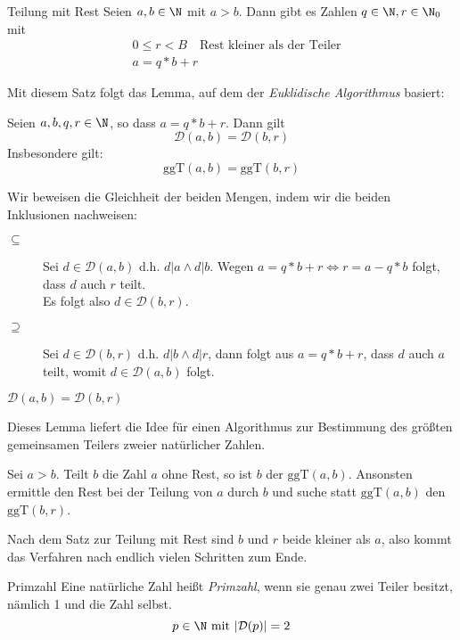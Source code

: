 \begin{satz}{Teilung mit Rest}
  Seien $a,b\in\N$ mit $a>b$. Dann gibt es Zahlen $q\in\N, r\in\N_0$ mit
  \begin{align*}
    &0\leq r<B \quad\text{Rest kleiner als der Teiler}\\
    &a=q*b+r
  \end{align*}
\end{satz}
Mit diesem Satz folgt das Lemma, auf dem der \emph{Euklidische Algorithmus} basiert:
\begin{lemma}{}
  Seien $a,b,q,r\in\N$, so dass $a=q*b+r$. Dann gilt
  \begin{equation*}
    \mathcal{D}(a,b)=\mathcal{D}(b,r)
  \end{equation*}
  Insbesondere gilt:
  \begin{equation*}
    \mathrm{ggT}(a,b)=\mathrm{ggT}(b,r)
  \end{equation*}
\end{lemma}
\beweis
Wir beweisen die Gleichheit der beiden Mengen, indem wir die beiden Inklusionen nachweisen:

\begin{description}
  \item[\glqq$\subseteq$\grqq]
  Sei $d\in\mathcal{D}(a,b)$ d.h. $d|a \wedge d|b$. Wegen $a=q*b+r \Leftrightarrow r=a-q*b$ folgt, dass $d$ auch $r$ teilt.\\
  Es folgt also $d\in \mathcal{D}(b,r)$.
  \item[\glqq$\supseteq$\grqq]
  Sei $d\in\mathcal{D}(b,r)$ d.h. $d|b\wedge d|r$, dann folgt aus $a=q*b+r$, dass $d$ auch $a$ teilt, womit $d\in \mathcal{D}(a,b)$ folgt.
\end{description}
$\mathcal{D}(a,b)=\mathcal{D}(b,r)$

\par\medskip
Dieses Lemma liefert die Idee für einen Algorithmus zur Bestimmung des größten gemeinsamen Teilers zweier natürlicher Zahlen.

Sei $a>b$. Teilt $b$ die Zahl $a$ ohne Rest, so ist $b$ der $\mathrm{ggT}(a,b)$. Ansonsten ermittle den Rest bei der Teilung von $a$ durch $b$ und suche statt $\mathrm{ggT}(a,b)$ den $\mathrm{ggT}(b,r)$.

Nach dem Satz zur Teilung mit Rest sind $b$ und $r$ beide kleiner als $a$, also kommt das Verfahren nach endlich vielen Schritten zum Ende.

\begin{definition}{Primzahl}
	Eine natürliche Zahl heißt \emph{Primzahl}, wenn sie genau zwei Teiler besitzt, nämlich 1 und die Zahl selbst.
	\begin{equation*}
	  p\in\N \text{ mit } |\mathcal{D}(p)| = 2
	\end{equation*}
\end{definition}

